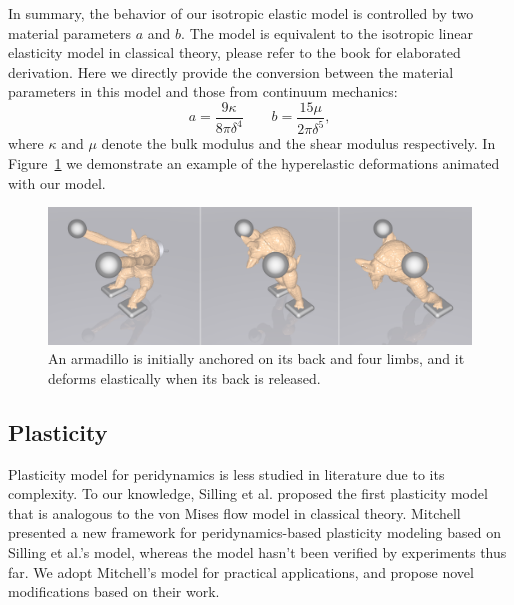 In summary, the behavior of our isotropic elastic model is controlled by two material parameters $a$ and $b$. The model is equivalent to the isotropic linear elasticity model in classical theory, please refer to the book\cite{madenci2014peridynamic} for elaborated derivation. Here we directly provide the conversion between the material parameters in this model and those from continuum mechanics:
\begin{equation}
a = \frac{9\kappa}{8\pi\delta^4} \qquad b = \frac{15\mu}{2\pi\delta^5},
\label{eq:9}
\end{equation}
where $\kappa$ and $\mu$ denote the bulk modulus and the shear modulus respectively. In Figure~\ref{fig:3} we demonstrate an example of the hyperelastic deformations animated with our model.
\begin{figure}[t]
  \centering
  \includegraphics[width=\linewidth]{./figs/demo_pull_armadillo.png}
  \caption{\label{fig:3}
  An armadillo is initially anchored on its back and four limbs, and it deforms elastically when its back is released.
}
\end{figure}

\subsection{Plasticity}

Plasticity model for peridynamics is less studied in literature due to its complexity. To our knowledge, Silling et al. \cite{silling2007peridynamic} proposed the first plasticity model that is analogous to the von Mises flow model in classical theory. Mitchell presented a new framework for peridynamics-based plasticity modeling\cite{mitchell2011nonlocal} based on Silling et al.'s model, whereas the model hasn't been verified by experiments thus far. We adopt Mitchell's model for practical applications, and propose novel modifications based on their work.

